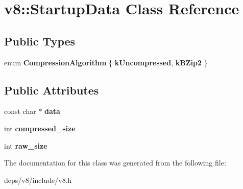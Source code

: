 \hypertarget{classv8_1_1_startup_data}{}\section{v8\+:\+:Startup\+Data Class Reference}
\label{classv8_1_1_startup_data}
\subsection*{Public Types}
\begin{DoxyCompactItemize}
\item 
\hypertarget{classv8_1_1_startup_data_ab23e8d8db2bbc803cf6db68e258d64f0}{}enum {\bfseries Compression\+Algorithm} \{ {\bfseries k\+Uncompressed}, 
{\bfseries k\+B\+Zip2}
 \}\label{classv8_1_1_startup_data_ab23e8d8db2bbc803cf6db68e258d64f0}

\end{DoxyCompactItemize}
\subsection*{Public Attributes}
\begin{DoxyCompactItemize}
\item 
\hypertarget{classv8_1_1_startup_data_a8daf0c5282d7c465988757dc4ecda1af}{}const char $\ast$ {\bfseries data}\label{classv8_1_1_startup_data_a8daf0c5282d7c465988757dc4ecda1af}

\item 
\hypertarget{classv8_1_1_startup_data_a8037d1138d46d3977384c0e056ea5920}{}int {\bfseries compressed\+\_\+size}\label{classv8_1_1_startup_data_a8037d1138d46d3977384c0e056ea5920}

\item 
\hypertarget{classv8_1_1_startup_data_a2f797e167b2bebd18ddca83dedda6ffa}{}int {\bfseries raw\+\_\+size}\label{classv8_1_1_startup_data_a2f797e167b2bebd18ddca83dedda6ffa}

\end{DoxyCompactItemize}


The documentation for this class was generated from the following file\+:\begin{DoxyCompactItemize}
\item 
deps/v8/include/v8.\+h\end{DoxyCompactItemize}
